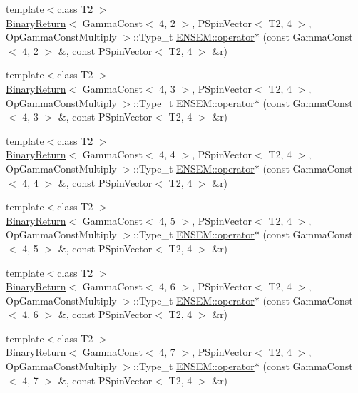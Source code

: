 \begin{DoxyCompactItemize}
\item 
{\footnotesize template$<$class T2 $>$ }\\\mbox{\hyperlink{structBinaryReturn}{Binary\+Return}}$<$ Gamma\+Const$<$ 4, 2 $>$, P\+Spin\+Vector$<$ T2, 4 $>$, Op\+Gamma\+Const\+Multiply $>$\+::Type\+\_\+t \mbox{\hyperlink{group__primspinvector_ga89998f51b7e59a05842c92f95ca427e4}{E\+N\+S\+E\+M\+::operator$\ast$}} (const Gamma\+Const$<$ 4, 2 $>$ \&, const P\+Spin\+Vector$<$ T2, 4 $>$ \&r)
\item 
{\footnotesize template$<$class T2 $>$ }\\\mbox{\hyperlink{structBinaryReturn}{Binary\+Return}}$<$ Gamma\+Const$<$ 4, 3 $>$, P\+Spin\+Vector$<$ T2, 4 $>$, Op\+Gamma\+Const\+Multiply $>$\+::Type\+\_\+t \mbox{\hyperlink{group__primspinvector_gade157607bce53ec9ffcde3e07f772efb}{E\+N\+S\+E\+M\+::operator$\ast$}} (const Gamma\+Const$<$ 4, 3 $>$ \&, const P\+Spin\+Vector$<$ T2, 4 $>$ \&r)
\item 
{\footnotesize template$<$class T2 $>$ }\\\mbox{\hyperlink{structBinaryReturn}{Binary\+Return}}$<$ Gamma\+Const$<$ 4, 4 $>$, P\+Spin\+Vector$<$ T2, 4 $>$, Op\+Gamma\+Const\+Multiply $>$\+::Type\+\_\+t \mbox{\hyperlink{group__primspinvector_gaa8429bcfc1a7a130ec526f34f8b08c20}{E\+N\+S\+E\+M\+::operator$\ast$}} (const Gamma\+Const$<$ 4, 4 $>$ \&, const P\+Spin\+Vector$<$ T2, 4 $>$ \&r)
\item 
{\footnotesize template$<$class T2 $>$ }\\\mbox{\hyperlink{structBinaryReturn}{Binary\+Return}}$<$ Gamma\+Const$<$ 4, 5 $>$, P\+Spin\+Vector$<$ T2, 4 $>$, Op\+Gamma\+Const\+Multiply $>$\+::Type\+\_\+t \mbox{\hyperlink{group__primspinvector_ga173eb3594c9d1774c080d3df7116efbd}{E\+N\+S\+E\+M\+::operator$\ast$}} (const Gamma\+Const$<$ 4, 5 $>$ \&, const P\+Spin\+Vector$<$ T2, 4 $>$ \&r)
\item 
{\footnotesize template$<$class T2 $>$ }\\\mbox{\hyperlink{structBinaryReturn}{Binary\+Return}}$<$ Gamma\+Const$<$ 4, 6 $>$, P\+Spin\+Vector$<$ T2, 4 $>$, Op\+Gamma\+Const\+Multiply $>$\+::Type\+\_\+t \mbox{\hyperlink{group__primspinvector_gad9a09b9039ac73a95c0893a4bfd306c2}{E\+N\+S\+E\+M\+::operator$\ast$}} (const Gamma\+Const$<$ 4, 6 $>$ \&, const P\+Spin\+Vector$<$ T2, 4 $>$ \&r)
\item 
{\footnotesize template$<$class T2 $>$ }\\\mbox{\hyperlink{structBinaryReturn}{Binary\+Return}}$<$ Gamma\+Const$<$ 4, 7 $>$, P\+Spin\+Vector$<$ T2, 4 $>$, Op\+Gamma\+Const\+Multiply $>$\+::Type\+\_\+t \mbox{\hyperlink{group__primspinvector_ga155a168cc76a655423d76a2ad99776a1}{E\+N\+S\+E\+M\+::operator$\ast$}} (const Gamma\+Const$<$ 4, 7 $>$ \&, const P\+Spin\+Vector$<$ T2, 4 $>$ \&r)

\end{DoxyCompactItemize}
